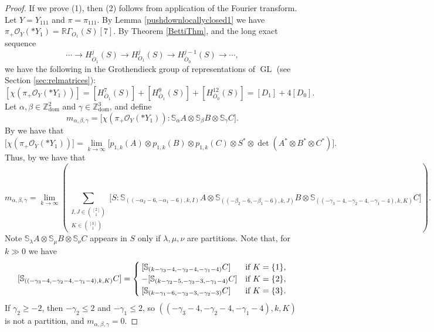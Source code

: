 \documentclass[11pt,reqno]{amsart}
\newcommand{\oo}{\otimes}
\newcommand{\bS}{\mathbb{S}}
\newcommand{\tn}{\textnormal}
\newcommand{\GL}{\operatorname{GL}}
\renewcommand{\det}{\operatorname{det}}
\newcommand{\dom}{\operatorname{dom}}
\newcommand{\mc}[1]{\mathcal{#1}}
\newcommand{\ol}[1]{\overline{#1}}
\numberwithin{equation}{section}
\begin{document}
\begin{proof}
If we prove (1), then (2) follows from application of the Fourier transform. Let $Y=Y_{111}$ and $\pi=\pi_{111}$. By Lemma \ref{pushdownlocallyclosed1} we have $\pi_{+}\mc{O}_Y(\ast Y_1)=\mathbb{R}\Gamma_{O_1}(S)[7]$. By Theorem \ref{BettiThm}, and the long exact sequence
$$
\cdots \to H^j_{\ol{O}_1}(S)\to H^j_{O_1}(S)\to H^{j-1}_{\ol{O}_0}(S)\to \cdots,
$$	
we have the following in the Grothendieck group of representations of $\GL$ (see Section \ref{sec:relmatrices}):
\begin{equation}\label{eqn:eulerCharinGG}
[\chi(\pi_{+}\mc{O}_Y(\ast Y_1))]=[H^7_{\ol{O}_1}(S)]+[H^9_{\ol{O}_1}(S)]+[H^{12}_{\ol{O}_0}(S)]=[D_1]+4[D_0].
\end{equation}
Let $\alpha,\beta\in \mathbb{Z}^2_{\dom}$ and $\gamma \in \mathbb{Z}^3_{\dom}$, and define 
$$
m_{\alpha,\beta,\gamma}=\big[ \chi(\pi_+ \mc{O}_Y(\ast Y_1)):\bS_{\alpha}A\oo \bS_{\beta}B \oo \bS_{\gamma}C\big].
$$
By \cite[Lemma 2.5, Proposition 2.10]{raicu2016characters} we have that 
$$
\big[\chi(\pi_+ \mc{O}_Y(\ast Y_1))\big]=\lim_{k\to \infty} \big[p_{1,k}(A)\oo p_{1,k}(B)\oo p_{1,k}(C)\oo S^{\ast}\otimes \det(A^{\ast}\oo B^{\ast}\oo C^{\ast})\big].
$$
Thus, by \cite[Lemma 2.3]{raicu2016characters} we have that
$$
m_{\alpha,\beta,\gamma}=\lim_{k\to \infty}\left(\sum_{\substack{I,J\in \binom{[2]}{1}\\ K\in \binom{[3]}{1}}}\big[S:\bS_{((-\alpha_2-6,-\alpha_1-6),k,I)}A\oo \bS_{((-\beta_2-6,-\beta_1-6),k,J)}B \oo \bS_{((-\gamma_3-4,-\gamma_2-4,-\gamma_1-4),k,K)}C \big]\right).
$$
Note $\bS_{\lambda}A\oo \bS_{\mu}B\oo \bS_{\nu}C$ appears in $S$ only if $\lambda,\mu,\nu$ are partitions. Note that, for $k\gg 0$ we have
$$
[\bS_{((-\gamma_3-4,-\gamma_2-4,-\gamma_1-4),k,K)}C]=\begin{cases}
[\bS_{(k-\gamma_3-4,-\gamma_2-4,-\gamma_1-4)}C] & \tn{if $K=\{1\}$},\\
-[\bS_{(k-\gamma_2-5,-\gamma_3-3,-\gamma_1-4)}C] & \tn{if $K=\{2\}$},\\
[\bS_{(k-\gamma_1-6,-\gamma_3-3,-\gamma_2-3)}C] & \tn{if $K=\{3\}$}.
\end{cases}
$$
If $\gamma_2\geq -2$, then $-\gamma_2\leq 2$ and $-\gamma_1\leq 2$, so $((-\gamma_3-4,-\gamma_2-4,-\gamma_1-4),k,K)$ is not a partition, and $m_{\alpha,\beta,\gamma}=0$.


\end{proof}
\end{document}
